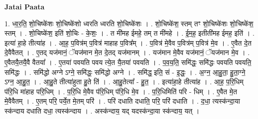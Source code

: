 \documentclass[17pt]{extarticle}
\begin{document}
\textbf{Jatai Paata} \newline

1. ध्व॒र॒ति॒ शो॒चिष्के॑शः शो॒चिष्के॑शो ध्वरति ध्वरति शो॒चिष्के॑शः । . शो॒चिष्के॑श॒ स्तम् तꣳ शो॒चिष्के॑शः शो॒चिष्के॑श॒ स्तम् । . शो॒चिष्के॑श॒ इति॑ शो॒चिः - के॒शः॒ । . त मी॑मह ईमहे॒ तम् त मी॑महे । . ई॒म॒ह॒ इतीती॑मह ईमह॒ इति॑ । . इत्या॑ हा॒हे तीत्या॑ह । . आ॒ह॒ प॒वित्र॑म् प॒वित्र॑ माहाह प॒वित्र᳚म् । . प॒वित्र॑ मे॒वैव प॒वित्र॑म् प॒वित्र॑ मे॒व । . ए॒वैत दे॒त दे॒वैवैतत् । . ए॒तद् यज॑मानं॒ ॅयज॑मान मे॒त दे॒तद् यज॑मानम् । . यज॑मान मे॒वैव यज॑मानं॒ ॅयज॑मान मे॒व । . ए॒वैतयै॒तयै॒वै वैतया᳚ । . ए॒तया॑ पवयति पवय त्ये॒त यै॒तया॑ पवयति । . प॒व॒य॒ति॒ समि॑द्धः॒ समि॑द्धः पवयति पवयति॒ समि॑द्धः । . समि॑द्धो अग्ने ऽग्ने॒ समि॑द्धः॒ समि॑द्धो अग्ने । . समि॑द्ध॒ इति॒ सं - इ॒द्धः॒ । . अ॒ग्न॒ आ॒हु॒ता॒ हु॒ता॒ग्ने॒ ऽग्न॒ आ॒हु॒त॒ । . आ॒हु॒ते तीत्या॑हुता हु॒ते ति॑ । . आ॒हु॒तेत्या᳚ - हु॒त॒ । . इत्या॑हा॒हे तीत्या॑ह । . आ॒ह॒ प॒रि॒धिम् प॑रि॒धि मा॑हाह परि॒धिम् । . प॒रि॒धि मे॒वैव प॑रि॒धिम् प॑रि॒धि मे॒व । . प॒रि॒धिमिति॑ परि - धिम् । . ए॒वैत मे॒त मे॒वैवैतम् । . ए॒तम् परि॒ पर्ये॒त मे॒तम् परि॑ । . परि॑ दधाति दधाति॒ परि॒ परि॑ दधाति । . द॒धा॒ त्यस्क॑न्दा॒या स्क॑न्दाय दधाति दधा॒ त्यस्क॑न्दाय । . अस्क॑न्दाय॒ यद् यदस्क॑न्दा॒या स्क॑न्दाय॒ यत् । \newline
\end{document}
